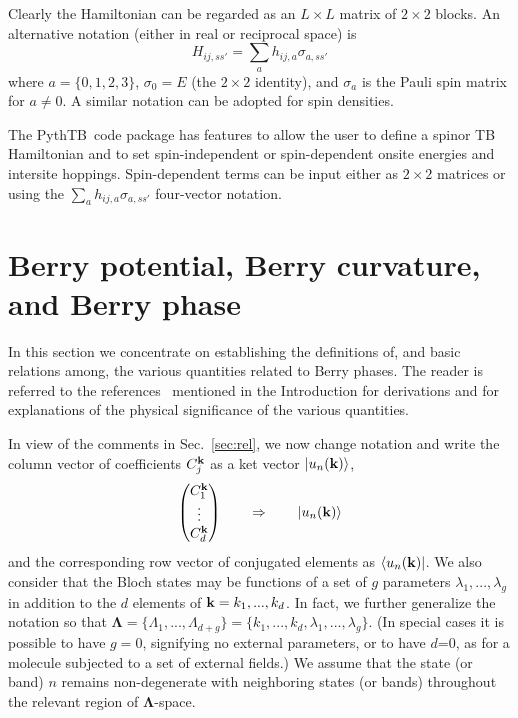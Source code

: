\documentclass[11pt]{article}
\numberwithin{equation}{section} %
\def\n{\noindent}
\def\beq{\begin{equation}}
\def\eeq{\end{equation}}
\def\PythTB{{\sc PythTB}}
\def\ket#1{\vert #1 \rangle}
\def\bra#1{\langle #1 \vert}
\def\k{{\bf k}}
\def\l{\lambda}
\def\L{\Lambda}
\def\bL{\mathbf{\Lambda}}
\begin{document}
Clearly the Hamiltonian can be regarded as an $L\times L$
matrix of $2\times 2$ blocks.  An alternative notation (either in
real or reciprocal space) is
%
\beq
H_{ij,ss'} = \sum_a h_{ij,a} \sigma_{a,ss'}
\eeq
%
where $a=\{0,1,2,3\}$, $\sigma_0=E$ (the $2\times2$ identity),
and $\sigma_a$ is the Pauli spin matrix for $a\ne0$.
A similar notation can be adopted for spin densities.

The \PythTB\ code package has features to allow the user to define
a spinor TB Hamiltonian and to set spin-independent or spin-dependent
onsite energies and intersite hoppings.  Spin-dependent terms
can be input either as $2\times 2$ matrices or using the $\sum_a
h_{ij,a} \sigma_{a,ss'}$ four-vector notation.

\section{Berry potential, Berry curvature, and Berry phase}
\label{sec:berry}

In this section we concentrate on establishing the definitions of,
and basic relations among, the various quantities related to
Berry phases.  The reader is referred to the
references~\cite{resta-rmp,vand-resta,xcn,resta-jpcm,wiki-berry}
mentioned in the Introduction for derivations and for explanations
of the physical significance of the various quantities.

In view of the comments in Sec.~\ref{sec:rel}, we now change notation
and write the column vector of coefficients $C^{\n\k}_j$ as a ket
vector $\ket{u_n(\k)}$,
%
\beq
\begin{pmatrix}
C^{\n\k}_1 \cr \vdots \cr C^{\n\k}_d
\end{pmatrix}
\qquad\Rightarrow\qquad
\ket{u_n(\k)}
\label{eq:notat}
\eeq
%
and the corresponding row vector of conjugated
elements as $\bra{u_n(\k)}$.  We also consider that the Bloch
states may be functions of a set of $g$ parameters $\l_1,...,\l_g$
in addition to the $d$ elements of $\k=k_1,...,k_d$.  In fact,
we further generalize the notation so that
$\bL=\{\L_1,...,\L_{d+g}\} = \{k_1,...,k_d,\l_1,...,\l_g\}$.
(In special cases it is possible to have $g=0$, signifying no
external parameters, or to have $d$=0, as for a molecule
subjected to a set of external fields.)
We assume that the state (or band) $n$ remains non-degenerate with neighboring
states (or bands) throughout the relevant region of $\bL$-space.
\end{document}
